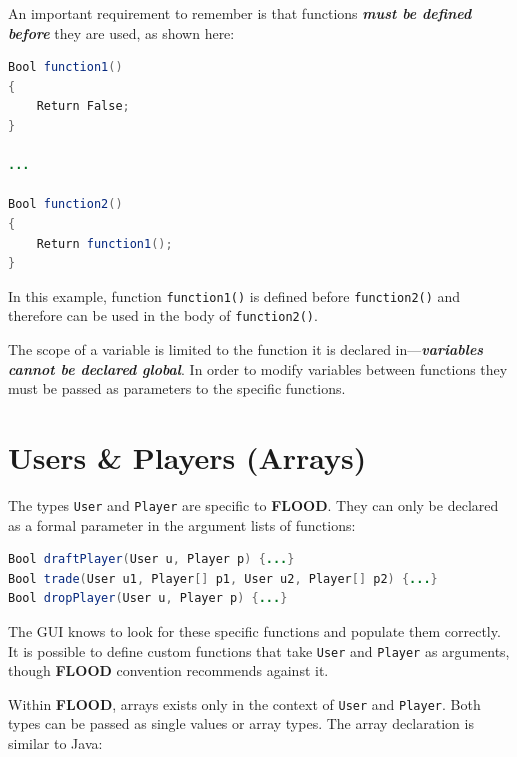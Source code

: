 \documentclass[12pt]{report}
\begin{document}
An important requirement to remember is that functions \textit{\textbf{must be defined before}} they are used, as shown here:

\begin{singlespace}
\begin{lstlisting}[language=Java,label=some-code,caption=A function must be defined before being called]
Bool function1()
{
	Return False;
} 

...

Bool function2()
{
	Return function1();
} 
\end{lstlisting}
\end{singlespace}

In this example, function \texttt{function1()} is defined before \texttt{function2()} and therefore can be used in the body of \texttt{function2()}. 

The scope of a variable is limited to the function it is declared in---\textit{\textbf{variables cannot be declared global}}. In order to modify variables between functions they must be passed as parameters to the specific functions.

\section{Users \& Players (Arrays)}

The types \texttt{User} and \texttt{Player} are specific to \textbf{FLOOD}. They can only be declared as a formal parameter in the argument lists of functions:

\begin{singlespace}
\begin{lstlisting}[language=Java,label=some-code,caption=User and Player declared in function argument list]
Bool draftPlayer(User u, Player p) {...}
Bool trade(User u1, Player[] p1, User u2, Player[] p2) {...}
Bool dropPlayer(User u, Player p) {...}
\end{lstlisting}
\end{singlespace}

The GUI knows to look for these specific functions and populate them correctly. It is possible to define custom functions that take \texttt{User} and \texttt{Player} as arguments, though \textbf{FLOOD} convention recommends against it. 

Within \textbf{FLOOD}, arrays exists only in the context of \texttt{User} and \texttt{Player}. Both types can be passed as single values or array types. The array declaration is similar to Java:
\end{document}
